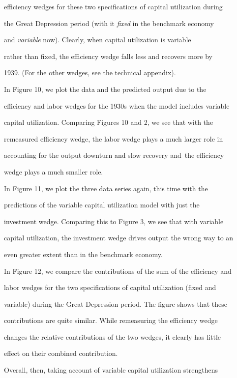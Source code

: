 \documentclass[fleqn,leqno,11pt]{article}
\begin{document}
efficiency wedges for these two specifications of capital utilization during

the Great Depression period (with it \emph{fixed} in the benchmark economy

and \emph{variable} now). Clearly, when capital utilization is variable

rather than fixed, the efficiency wedge falls less and recovers more by

1939. (For the other wedges, see the technical appendix).



In Figure 10, we plot the data and the predicted output due to the

efficiency and labor wedges for the 1930s when the model includes variable

capital utilization. Comparing Figures 10 and 2, we see that with the

remeasured efficiency wedge, the labor wedge plays a much larger role in

accounting for the output downturn and slow recovery and\ the efficiency

wedge plays a much smaller role.



In Figure 11, we plot the three data series again, this time with the

predictions of the variable capital utilization model with just the

investment wedge. Comparing this to Figure 3, we see that with variable

capital utilization, the investment wedge drives output the wrong way to an

even greater extent than in the benchmark economy.



In Figure 12, we compare the contributions of the sum of the efficiency and

labor wedges for the two specifications of capital utilization (fixed and

variable) during the Great Depression period. The figure shows that these

contributions are quite similar. While remeasuring the efficiency wedge

changes the relative contributions of the two wedges, it clearly has little

effect on their combined contribution.



Overall, then, taking account of variable capital utilization strengthens
\end{document}
